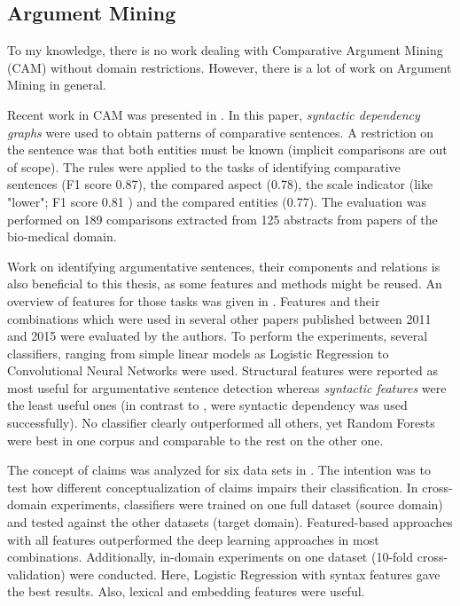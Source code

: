 \subsection{Argument Mining}
\label{sec:argmine}
To my knowledge, there is no work dealing with Comparative Argument Mining (CAM) without domain restrictions. However, there is a lot of work on Argument Mining in general.\newline

Recent work in CAM was presented in \cite{gupta2017identifying}. In this paper, \emph{syntactic dependency graphs} were used to obtain patterns of comparative sentences. A restriction on the sentence was that both entities must be known (implicit comparisons are out of scope).  The rules were applied to the tasks of identifying comparative sentences (F1 score 0.87), the compared aspect (0.78), the scale indicator (like "lower"; F1 score 0.81 ) and the compared entities (0.77). The evaluation was performed on 189 comparisons extracted from 125 abstracts from papers of the bio-medical domain. \newline

Work on identifying argumentative sentences, their components and relations is also beneficial to this thesis, as some features and methods might be reused. An overview of features for those tasks was given in \cite{Aker2017What-works-and-}. Features and their combinations which were used in several other papers published between 2011 and 2015 were evaluated by the authors. To perform the experiments, several classifiers, ranging from simple linear models as Logistic Regression to Convolutional Neural Networks were used. 
Structural features were reported as most useful for argumentative sentence detection whereas \emph{syntactic features} were the least useful ones (in contrast to \cite{gupta2017identifying}, were syntactic dependency was used successfully). No classifier clearly outperformed all others, yet Random Forests were best in one corpus and comparable to the rest on the other one.\newline

The concept of claims was analyzed for six data sets in \cite{Daxenberger2017What-is-the-Ess}. The intention was to test how different conceptualization of claims impairs their classification. In cross-domain experiments, classifiers were trained on one full dataset (source domain) and tested against the other datasets (target domain). Featured-based approaches with all features outperformed the deep learning approaches in most combinations. Additionally, in-domain experiments on one dataset (10-fold cross-validation) were conducted. Here, Logistic Regression with syntax features gave the best results. Also, lexical and embedding features were useful.\newline


